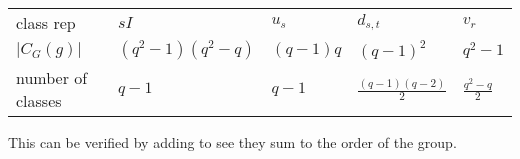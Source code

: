 \documentclass[12pt,twoside]{reedthesis}
\theoremstyle{definition}\newtheorem{definition}{Definition}
\theoremstyle{definition}\newtheorem{example}{Example}
\begin{document}
\begin{table}[h]
\begin{tabular}{l|llll}
       &    &    &     &    \\ \hline
class rep  & $sI$ & $u_s$ & $d_{s,t}$ & $v_r$ \\
$|C_G(g)|$     & $(q^2-1)(q^2-q)$  & $(q-1)q$  & $(q-1)^2$   &  $q^2-1$ \\
number of classes & $q-1$ &  $q-1$  & $\frac{(q-1)(q-2)}{2}$   & $\frac{q^2-q}{2}$ 
\end{tabular}
\end{table}


This can be verified by adding to see they sum to the order of the group.
\end{document}
